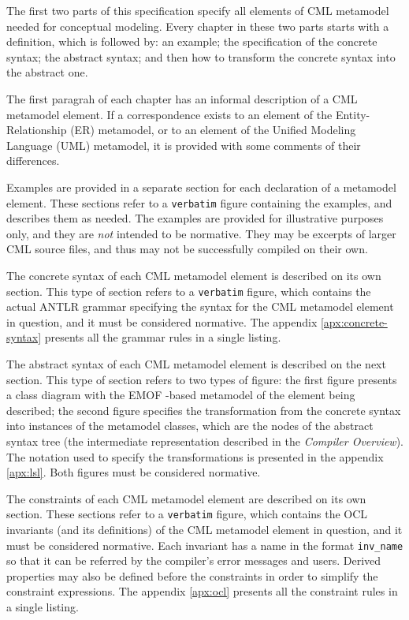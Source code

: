 The first two parts of this specification specify all elements of CML metamodel
needed for conceptual modeling.
Every chapter in these two parts starts with a definition,
which is followed by: an example;
the specification of the concrete syntax;
the abstract syntax;
and then how to transform the concrete syntax into the abstract one.

The first paragrah of each chapter has an informal description
of a CML metamodel element.
If a correspondence exists to an element of
the Entity-Relationship (ER) \cite{er} metamodel,
or to an element of the Unified Modeling Language (UML) \cite{uml} metamodel,
it is provided with some comments of their differences.

Examples are provided in a separate section
for each declaration of a metamodel element.
These sections refer to a \verb+verbatim+ figure containing the examples,
and describes them as needed.
The examples are provided for illustrative purposes only,
and they are \emph{not} intended to be normative.
They may be excerpts of larger CML source files,
and thus may not be successfully compiled on their own.

The concrete syntax of each CML metamodel element is described
on its own section.
This type of section refers to a \verb+verbatim+ figure,
which contains the actual ANTLR \cite{antlr} grammar
specifying the syntax for the CML metamodel element in question,
and it must be considered normative.
The appendix \ref{apx:concrete-syntax} presents all the grammar rules
in a single listing.

The abstract syntax of each CML metamodel element is described
on the next section.
This type of section refers to two types of figure:
the first figure presents a class diagram
with the EMOF \cite{mof}-based metamodel
of the element being described;
the second figure specifies the transformation
from the concrete syntax into instances of the metamodel classes,
which are the nodes of the abstract syntax tree
(the intermediate representation described in the \emph{Compiler Overview}).
The notation used to specify the transformations is presented
in the appendix \ref{apx:lsl}.
Both figures must be considered normative.

The constraints of each CML metamodel element are described
on its own section.
These sections refer to a \verb+verbatim+ figure,
which contains the OCL \cite{ocl} invariants
(and its definitions)
of the CML metamodel element in question,
and it must be considered normative.
Each invariant has a name in the format \verb+inv_name+
so that it can be referred by the compiler's error messages
and users.
Derived properties may also be defined before the constraints
in order to simplify the constraint expressions.
The appendix \ref{apx:ocl} presents all the constraint rules
in a single listing.

